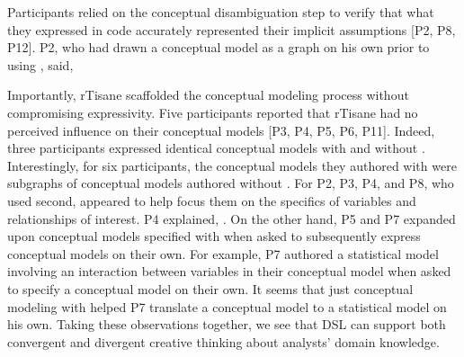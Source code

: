 Participants relied on the conceptual disambiguation step to verify that what
they expressed in code accurately represented their implicit assumptions [P2,
P8, P12]. P2, who had drawn a conceptual model as a graph on his own prior to
using \rTisane, said, 

Importantly, rTisane scaffolded the conceptual modeling process without
compromising expressivity. Five participants reported that rTisane had no
perceived influence on their conceptual models [P3, P4, P5, P6, P11]. Indeed,
three participants expressed identical conceptual models with and without
\rTisane [P9, P11, P12]. Interestingly, for six participants, the
conceptual models they authored with \rTisane were subgraphs of conceptual models
authored without \rTisane[P2, P3, P4, P5, P7, P8]. 
For P2, P3, P4, and P8, who used \rTisane second, \rTisane appeared to help
focus them on the specifics of variables and relationships of interest. P4 explained, .
On the other hand, P5 and P7 expanded upon conceptual models specified with \rTisane when asked to
subsequently express conceptual models on their own. For example, P7 authored a
statistical model involving an interaction between variables in their \rTisane
conceptual model when asked to specify a conceptual model on their own. It seems
that just conceptual modeling with \rTisane helped P7 translate a conceptual
model to a statistical model on his own. Taking these observations together, we
see that \rTisanes DSL can support both convergent and divergent creative
thinking about analysts' domain knowledge. 

